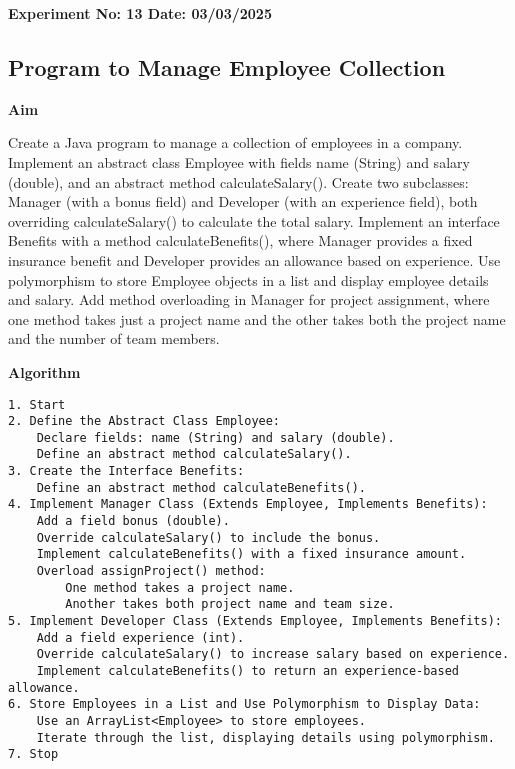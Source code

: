 \textbf{Experiment No: 13 \hfill Date: 03/03/2025}

\begin{center}
    \Large \subsection*{Program to Manage Employee Collection}
\end{center}

\textbf{Aim}
\vspace{0.5cm}

Create a Java program to manage a collection of employees in a company. Implement an abstract class Employee with fields name (String) and salary (double), and an abstract method calculateSalary(). Create two subclasses: Manager (with a bonus field) and Developer (with an experience field), both overriding calculateSalary() to calculate the total salary. Implement an interface Benefits with a method calculateBenefits(), where Manager provides a fixed insurance benefit and Developer provides an allowance based on experience. Use polymorphism to store Employee objects in a list and display employee details and salary. Add method overloading in Manager for project assignment, where one method takes just a project name and the other takes both the project name and the number of team members.

\vspace{0.5cm}
\textbf{Algorithm}
\vspace{0.5cm}
\begin{verbatim}
1. Start
2. Define the Abstract Class Employee:
    Declare fields: name (String) and salary (double).
    Define an abstract method calculateSalary().
3. Create the Interface Benefits:
    Define an abstract method calculateBenefits().
4. Implement Manager Class (Extends Employee, Implements Benefits):
    Add a field bonus (double).
    Override calculateSalary() to include the bonus.
    Implement calculateBenefits() with a fixed insurance amount.
    Overload assignProject() method:
        One method takes a project name.
        Another takes both project name and team size.
5. Implement Developer Class (Extends Employee, Implements Benefits):
    Add a field experience (int).
    Override calculateSalary() to increase salary based on experience.
    Implement calculateBenefits() to return an experience-based allowance.
6. Store Employees in a List and Use Polymorphism to Display Data:
    Use an ArrayList<Employee> to store employees.
    Iterate through the list, displaying details using polymorphism.
7. Stop
\end{verbatim}

